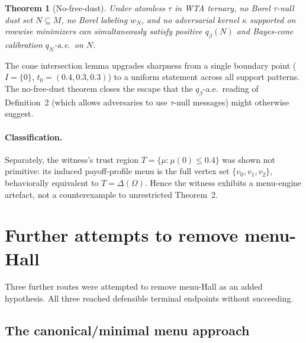 \documentclass[11pt]{article}
\newtheorem{theorem}{Theorem}
\theoremstyle{definition}
\theoremstyle{remark}
\newcommand{\Om}{\Omega}
\begin{document}
\begin{theorem}[No-free-dust]
Under atomless $\tau$ in WTA ternary, no Borel $\tau$-null dust set
$N\subseteq M$, no Borel labeling $w_N$, and no adversarial kernel
$\kappa$ supported on rowwise minimizers can simultaneously satisfy
positive $q_\beta(N)$ and Bayes-cone calibration $q_N$-a.e.\ on $N$.
\end{theorem}

The cone intersection lemma upgrades sharpness from a single boundary
point ($I = \{0\}$, $t_0 = (0.4, 0.3, 0.3)$) to a uniform statement
across all support patterns. The no-free-dust theorem closes the
escape that the $q_\beta$-a.e.\ reading of Definition~2 (which
allows adversaries to use $\tau$-null messages) might otherwise
suggest.

\paragraph{Classification.} Separately, the witness's trust region
$T = \{\mu : \mu(0)\le 0.4\}$ was shown not primitive: its induced
payoff-profile menu is the full vertex set $\{v_0, v_1, v_2\}$,
behaviorally equivalent to $T = \Delta(\Om)$. Hence the witness
exhibits a menu-engine artefact, not a counterexample to
unrestricted Theorem~2.

\section{Further attempts to remove menu-Hall}\label{sec:further}

Three further routes were attempted to remove menu-Hall as an added
hypothesis. All three reached defensible terminal endpoints without
succeeding.

\subsection{The canonical/minimal menu approach}\label{sec:canonical}
\end{document}
